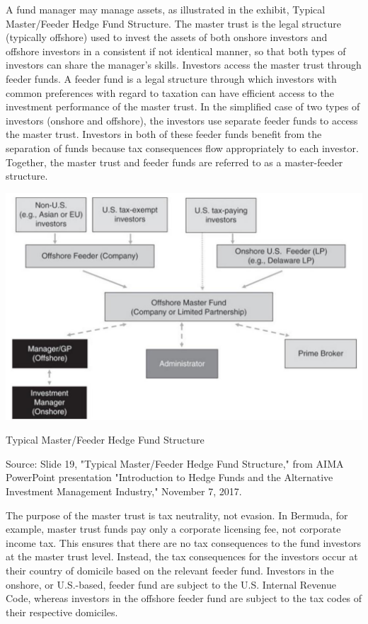 \documentclass[11pt]{article}
\begin{document}
A fund manager may manage assets, as illustrated in the exhibit, Typical Master/Feeder Hedge Fund Structure. The master trust is the legal structure (typically offshore) used to invest the assets of both onshore investors and offshore investors in a consistent if not identical manner, so that both types of investors can share the manager's skills. Investors access the master trust through feeder funds. A feeder fund is a legal structure through which investors with common preferences with regard to taxation can have efficient access to the investment performance of the master trust. In the simplified case of two types of investors (onshore and offshore), the investors use separate feeder funds to access the master trust. Investors in both of these feeder funds benefit from the separation of funds because tax consequences flow appropriately to each investor. Together, the master trust and feeder funds are referred to as a master-feeder structure.

\begin{center}
\includegraphics[max width=\textwidth]{2024_04_10_4befcf0ec10e9bee26edg-3}
\end{center}

Typical Master/Feeder Hedge Fund Structure

Source: Slide 19, "Typical Master/Feeder Hedge Fund Structure," from AIMA PowerPoint presentation "Introduction to Hedge Funds and the Alternative Investment Management Industry," November 7, 2017.

The purpose of the master trust is tax neutrality, not evasion. In Bermuda, for example, master trust funds pay only a corporate licensing fee, not corporate income tax. This ensures that there are no tax consequences to the fund investors at the master trust level. Instead, the tax consequences for the investors occur at their country of domicile based on the relevant feeder fund. Investors in the onshore, or U.S.-based, feeder fund are subject to the U.S. Internal Revenue Code, whereas investors in the offshore feeder fund are subject to the tax codes of their respective domiciles.
\end{document}
